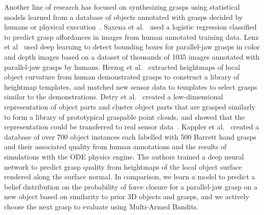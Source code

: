 Another line of research has focused on synthesizing grasps using statistical models learned from a database of objects annotated with grasps decided by humans or physical execution~\cite{bohg2014data}.
Saxena et al.~\cite{jiang2011efficient, saxena2008robotic} used a logistic regression classified to predict grasp affordances in images from human annotated training data.
Lenz et al~\cite{lenz2015deep} used deep learning to detect bounding boxes for parallel-jaw grasps in color and depth images based on a dataset of thousands of 1035 images annotated with parallel-jaw grasps by humans.
Herzog et al.~\cite{herzog2012template, herzog2014learning} extracted heightmaps of local object curvature from human demonstrated grasps to construct a library of heightmap templates, and matched new sensor data to templates to select grasps similar to the demonstrations.
Detry et al.~\cite{detry2012generalizing} created a low-dimensional representation of object parts and cluster object parts that are grasped similarly to form a library of prototypical graspable point clouds, and showed that the representation could be transferred to real sensor data~\cite{detry2013learning}.
Kappler et al.~\cite{kappler2015leveraging} created a database of over 700 object instances each labelled with 500 Barrett hand grasps and their associated quality from human annotations and the results of simulations with the ODE physics engine.
The authors trained a deep neural network to predict grasp quality from heightmaps of the local object surface rendered along the surface normal. 
In comparison, we learn a model to predict a belief distribution on the probability of force closure for a parallel-jaw grasp on a new object based on similarity to prior 3D objects and grasps, and we actively choose the next grasp to evaluate using Multi-Armed Bandits.

